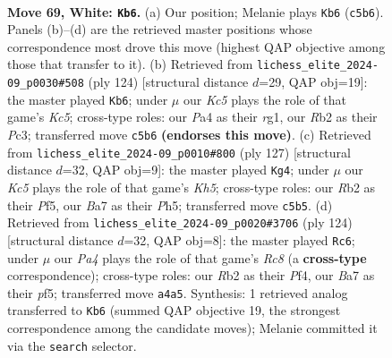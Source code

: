 \documentclass[11pt]{article}
\begin{document}
\clearpage

\begin{figure}[p]\centering
\begin{subfigure}{0.46\textwidth}\centering
\resizebox{\linewidth}{!}{%
\newchessgame
\chessboard[
  setfen={2b5/B3k3/8/2K5/P7/1P3Brp/1R5N/8 w - - 16 69},
  showmover=false,
  pgfstyle=straightmove, color=movearrow, markmove={c5-b6}
]}
\caption{}
\end{subfigure}\hfill
\begin{subfigure}{0.46\textwidth}\centering
\resizebox{\linewidth}{!}{%
\newchessgame
\chessboard[
  setfen={8/7p/7P/P1K1R1B1/4b3/2P2k2/8/6r1 w - - 11 63},
  showmover=false,
  pgfstyle=straightmove, color=movearrow, markmove={c5-b6}
]}
\caption{}
\end{subfigure}
\\[4pt]
\begin{subfigure}{0.46\textwidth}\centering
\resizebox{\linewidth}{!}{%
\newchessgame
\chessboard[
  setfen={8/8/8/p4p1p/Pb5k/1r6/1PR5/6K1 b - - 9 64},
  showmover=false,
  pgfstyle=straightmove, color=movearrow, markmove={h4-g4}
]}
\caption{}
\end{subfigure}\hfill
\begin{subfigure}{0.46\textwidth}\centering
\resizebox{\linewidth}{!}{%
\newchessgame
\chessboard[
  setfen={2RB4/4P1k1/4r3/5p2/4pP1p/8/4K3/8 w - - 1 63},
  showmover=false,
  pgfstyle=straightmove, color=movearrow, markmove={c8-c6}
]}
\caption{}
\end{subfigure}
\caption{\textbf{Move 69, White: \texttt{Kb6}.} (a) Our position; Melanie plays \texttt{Kb6} (\texttt{c5b6}). Panels (b)--(d) are the retrieved master positions whose correspondence most drove this move (highest QAP objective among those that transfer to it). (b) Retrieved from \texttt{lichess\_elite\_2024-09\_p0030\#508} (ply 124) [structural distance $d$=29, QAP obj=19]: the master played \texttt{Kb6}; under $\mu$ our \emph{Kc5} plays the role of that game's \emph{Kc5}; cross-type roles: our \emph{P}a4 as their \emph{r}g1, our \emph{R}b2 as their \emph{P}c3; transferred move \texttt{c5b6} \textbf{(endorses this move)}. (c) Retrieved from \texttt{lichess\_elite\_2024-09\_p0010\#800} (ply 127) [structural distance $d$=32, QAP obj=9]: the master played \texttt{Kg4}; under $\mu$ our \emph{Kc5} plays the role of that game's \emph{Kh5}; cross-type roles: our \emph{R}b2 as their \emph{P}f5, our \emph{B}a7 as their \emph{P}h5; transferred move \texttt{c5b5}. (d) Retrieved from \texttt{lichess\_elite\_2024-09\_p0020\#3706} (ply 124) [structural distance $d$=32, QAP obj=8]: the master played \texttt{Rc6}; under $\mu$ our \emph{Pa4} plays the role of that game's \emph{Rc8} (a \textbf{cross-type} correspondence); cross-type roles: our \emph{R}b2 as their \emph{P}f4, our \emph{B}a7 as their \emph{p}f5; transferred move \texttt{a4a5}. Synthesis: 1 retrieved analog transferred to \texttt{Kb6} (summed QAP objective 19, the strongest correspondence among the candidate moves); Melanie committed it via the \texttt{search} selector.}
\label{fig:thought-m136}
\end{figure}
\end{document}
